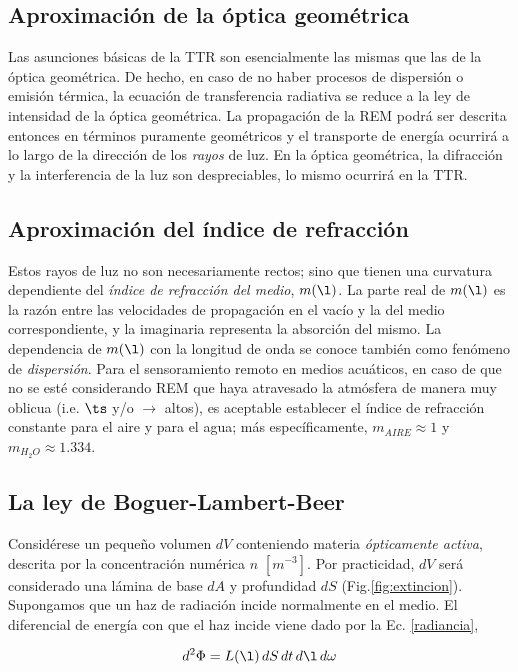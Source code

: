 \subsection{Aproximación de la óptica geométrica}
Las asunciones básicas de la TTR son esencialmente las mismas que las de la óptica geométrica. De hecho, en caso de no haber procesos de dispersión o emisión térmica, la ecuación de transferencia radiativa se reduce a la ley de intensidad de la óptica geométrica. La propagación de la REM podrá ser descrita entonces en términos puramente geométricos y el transporte de energía ocurrirá a lo largo de la dirección de los \textit{rayos} de luz. En la óptica geométrica, la difracción y la interferencia de la luz son despreciables, lo mismo ocurrirá en la TTR.

\subsection{Aproximación del índice de refracción}
\label{ch:marcofisico:aproxindrefrac}
Estos rayos de luz no son necesariamente rectos; sino que tienen una curvatura dependiente del \textit{índice de refracción del medio}, $m(\l)$. La parte real de $m(\l)$ es la razón entre las velocidades de propagación en el vacío y la del medio correspondiente, y la imaginaria representa la absorción del mismo. La dependencia de $m(\l)$ con la longitud de onda se conoce también como fenómeno de \textit{dispersión}. Para el sensoramiento remoto en medios acuáticos, en caso de que no se esté considerando REM que haya atravesado la atmósfera de manera muy oblicua (i.e. $\ts$ y/o $\to$ altos),
es aceptable establecer el índice de refracción constante para el aire y para el agua; más específicamente, $m_{AIRE}\approx 1$ y $m_{H_{2}O}\approx 1.334$.

\subsection{La ley de Boguer-Lambert-Beer}
\label{ch:marcofisico:boguerlambertbeer}
Considérese un peque\~no volumen $dV$ conteniendo materia \textit{ópticamente activa}, descrita por la concentración numérica $n$ $[m^{-3}]$. Por practicidad, $dV$ será considerado una lámina de base $dA$ y profundidad $dS$ (Fig.\ref{fig:extincion}). Supongamos que un haz de radiación incide normalmente en el medio. El diferencial de energía con que el haz incide viene dado por la Ec. \eqref{radiancia},

\begin{equation}
d^{2}\Phi=L(\l)\,dS\,dt\,d\l \,d\omega
\label{laambertdif1}
\end{equation}

